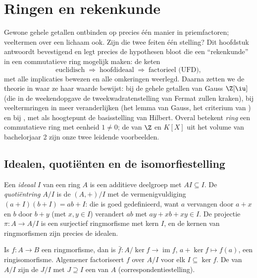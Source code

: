 \chapter{Ringen en rekenkunde}\label{ch:b3:rings}

Gewone gehele getallen ontbinden op precies één manier in
priemfactoren; veeltermen over een lichaam ook. Zijn die twee
feiten één stelling? Dit hoofdstuk antwoordt bevestigend en legt
precies de hypothesen bloot die een ``rekenkunde'' in een
commutatieve ring mogelijk maken: de keten
\[
\text{euclidisch} \;\Longrightarrow\; \text{hoofdideaal}
\;\Longrightarrow\; \text{factorieel (UFD)},
\]
met alle implicaties bewezen en alle omkeringen weerlegd. Daarna
zetten we de theorie in waar ze haar waarde bewijst: bij de gehele
getallen van Gauss $\Z[\iu]$ (die in de weekendopgave de
tweekwadratenstelling van Fermat zullen kraken), bij
veeltermringen in meer veranderlijken (het lemma van Gauss, het
criterium van ) en bij , met als
hoogtepunt de basisstelling van Hilbert. Overal betekent
\emph{ring} een commutatieve ring met eenheid $1 \neq 0$; de
 van $\Z$ en $K[X]$ uit het volume van bachelorjaar 2 zijn
onze twee leidende voorbeelden.

\section{Idealen, quotiënten en de isomorfiestelling}

\begin{definition}\label{def:b3:rings:ideal}
Een \emph{ideaal} $I$ van een ring $A$ is een
additieve deelgroep met $AI \subseteq I$. De
\emph{quotiëntring} $A/I$ is de 
$(A, +)/I$ met de vermenigvuldiging $(a + I)(b + I) = ab + I$: die
is goed gedefinieerd, want $a$ vervangen door $a + x$ en $b$ door
$b + y$ (met $x, y \in I$) verandert $ab$ met $ay + xb + xy \in I$.
De projectie $\pi \colon A \to A/I$ is een surjectief ringmorfisme
met kern $I$, en de kernen van ringmorfismen zijn precies de
idealen.
\end{definition}

\begin{theorem}\label{thm:b3:rings:firstiso}
Is $f \colon A \to B$ een ringmorfisme, dan is $\bar f\colon A/\ker
f \to \operatorname{im} f$, $a + \ker f \mapsto f(a)$, een
ringisomorfisme. Algemener factoriseert $f$ over $A/I$ voor elk
 $I \subseteq \ker f$. De  van $A/I$ zijn de $J/I$ met
$J \supseteq I$ een  van $A$ (correspondentiestelling).
\end{theorem}

